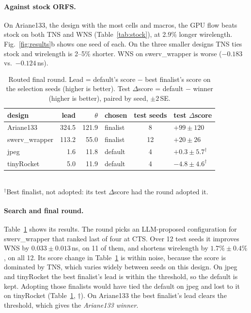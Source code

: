 \documentclass[sigconf]{acmart}
\begin{document}
\paragraph{Against stock ORFS\@.}
On Ariane133, the design with the most cells and macros, the GPU flow
beats stock on both TNS and WNS (Table~\ref{tab:stock}), at 2.9\% longer
wirelength. Fig.~\ref{fig:results}b shows one seed of each. On the three
smaller designs TNS ties stock and wirelength is 2--5\% shorter. WNS on
swerv\_wrapper is worse ($-0.183$ vs.\ $-0.124$\,ns).


\begin{table}[t]
  \caption{Routed final round. {\normalfont Lead = default's score $-$ best
  finalist's score on the selection seeds (higher is better). Test
  $\Delta$score = default $-$ winner (higher is better), paired by seed, $\pm 2$\,SE.}}
  \label{tab:final}
  \footnotesize
  \setlength{\tabcolsep}{2.5pt}
  \begin{tabular*}{\columnwidth}{@{\extracolsep{\fill}}lrrlcl@{}}
    \toprule
    design & lead & $\theta$ & chosen & test seeds & test $\Delta$score \\
    \midrule
    Ariane133 & 324.5 & 121.9 & finalist & 8 & $+99{\pm}120$ \\
    swerv\_wrapper & 113.2 & 55.0 & finalist & 12 & $+20{\pm}26$ \\
    jpeg & 1.6 & 11.8 & default & 4 & $+0.3{\pm}5.7^\dagger$ \\
    tinyRocket & 5.0 & 11.9 & default & 4 & $-4.8{\pm}4.6^\dagger$ \\
    \bottomrule
  \end{tabular*}\\[2pt]
  {\footnotesize $^\dagger$Best finalist, not adopted: its test $\Delta$score had
  the round adopted it.}
\end{table}

\paragraph{Search and final round.}
Table~\ref{tab:final} shows its results. The round picks an
LLM-proposed configuration for swerv\_wrapper that ranked last of four at
CTS. Over 12 test
seeds it improves WNS by $0.033 \pm 0.013$\,ns, on 11 of them, and shortens
wirelength by $1.7\% \pm 0.4\%$, on all 12. Its score change in
Table~\ref{tab:final} is within noise, because the score is dominated by TNS,
which varies widely between seeds on this design. On jpeg and tinyRocket
the best finalist's lead is within the threshold, so the default is kept. Adopting
those finalists would have tied the default on jpeg and lost to it on
tinyRocket (Table~\ref{tab:final}, $\dagger$). On
Ariane133 the best finalist's lead clears the threshold, which gives the
\emph{Ariane133 winner}.
\end{document}
